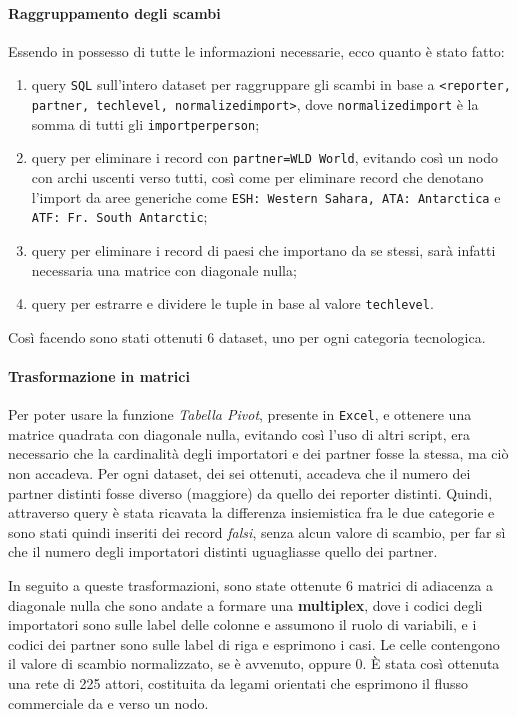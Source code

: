 \documentclass[]{article}
\begin{document}
\begin{multicols}{2}
	\paragraph{Raggruppamento degli scambi} Essendo in possesso di tutte le informazioni necessarie, ecco quanto è stato fatto:
	\begin{enumerate}
		\item query \texttt{SQL} sull'intero dataset per raggruppare gli scambi in base a \texttt{<reporter, partner, techlevel, normalizedimport>}, dove \texttt{normalizedimport} è la somma di tutti gli \texttt{importperperson};
		\item query per eliminare i record con \texttt{partner=WLD World}, evitando così un nodo con archi uscenti verso tutti, così come per eliminare record che denotano l'import da aree generiche come \texttt{ESH: Western Sahara, ATA: Antarctica} e \texttt{ATF: Fr. South Antarctic};
		\item query per eliminare i record di paesi che importano da se stessi, sarà infatti necessaria una matrice con diagonale nulla;
		\item query per estrarre e dividere le tuple in base al valore \texttt{techlevel}.
	\end{enumerate}
	Così facendo sono stati ottenuti 6 dataset, uno per ogni categoria tecnologica.
	
	\paragraph{Trasformazione in matrici} Per poter usare la funzione \textit{Tabella Pivot}, presente in \texttt{Excel}, e ottenere una matrice quadrata con diagonale nulla, evitando così l'uso di altri script, era necessario che la cardinalità degli importatori e dei partner fosse la stessa, ma ciò non accadeva. Per ogni dataset, dei sei ottenuti, accadeva che il numero dei partner distinti fosse diverso (maggiore) da quello dei reporter distinti. Quindi, attraverso query è stata ricavata la differenza insiemistica fra le due categorie e sono stati quindi inseriti dei record \textit{falsi}, senza alcun valore di scambio, per far sì che il numero degli importatori distinti uguagliasse quello dei partner.
	
	In seguito a queste trasformazioni, sono state ottenute 6 matrici di adiacenza a diagonale nulla che sono andate a formare una \textbf{multiplex}, dove i codici degli importatori sono sulle label delle colonne e assumono il ruolo di variabili, e i codici dei partner sono sulle label di riga e esprimono i casi. Le celle contengono il valore di scambio normalizzato, se è avvenuto, oppure 0. È stata così ottenuta una rete di 225 attori, costituita da legami orientati che esprimono il flusso commerciale da e verso un nodo.
	

\end{multicols}
\end{document}
